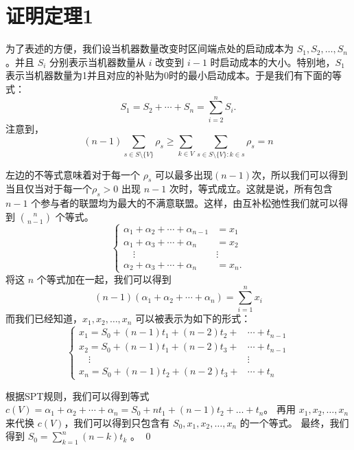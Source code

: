 \documentclass[UTF8]{article}
\begin{document}
\section*{证明定理1}
为了表述的方便，我们设当机器数量改变时区间端点处的启动成本为 $S_{1},S_{2}, \dots ,S_{n}$。并且 $S_{i}$ 分别表示当机器数量从 $i$ 改变到 $i-1$ 时启动成本的大小。特别地，$S_{1}$ 表示当机器数量为1并且对应的补贴为0时的最小启动成本。于是我们有下面的等式：
\begin{displaymath}
  S_{1}=S_{2}+\cdots+S_{n}=\sum_{i=2}^n S_i.
\end{displaymath}
注意到，
\begin{displaymath}
  (n-1) \sum_{s \in S \setminus\{V\} } \rho_s \geq
  \sum_{k\in V}\sum_{s \in S \setminus\{V\}:k \in s} \rho_s = n
\end{displaymath}

左边的不等式意味着对于每一个 $\rho_s$ 可以最多出现$(n-1)$次，所以我们可以得到当且仅当对于每一个$\rho_s > 0$ 出现 $n-1$ 次时，等式成立。这就是说，所有包含 $n-1$ 个参与者的联盟均为最大的不满意联盟。这样，由互补松弛性我们就可以得到 $n \choose n-1$ 个等式。
\[
\begin{cases}
 \alpha_1+\alpha_2+ \cdots+\alpha_{n-1} & = x_1 \\
 \alpha_1+\alpha_3+ \cdots+\alpha_n & = x_2 \\
 \quad   \vdots        &\vdots\\
 \alpha_2+\alpha_3+ \cdots+\alpha_n & = x_n.
\end{cases}
\]
将这 $n$ 个等式加在一起，我们可以得到
\begin{equation*}
  (n-1)(\alpha_1+\alpha_2+ \cdots+\alpha_n)=\sum_{i=1}^{n}x_i
\end{equation*}
而我们已经知道，$x_1,x_2,\dots,x_n$ 可以被表示为如下的形式：
\[
\begin{cases}
x_1 = S_0 + (n-1)t_1 + (n-2)t_2 + &\cdots + t_{n-1} \\
x_2 = S_0 + (n-1)t_1 + (n-2)t_3 + &\cdots + t_{n-1} \\
\quad   \vdots        &\vdots\\
x_n = S_0 + (n-1)t_2 + (n-2)t_3 + &\cdots + t_{n}
\end{cases}
\]

根据SPT规则，我们可以得到等式 $c(V)=\alpha_1+\alpha_2+\cdots+\alpha_n=S_0+nt_1+(n-1)t_2+\dots+t_n$。
再用 $x_1,x_2,\dots,x_n$ 来代换 $c(V)$，我们可以得到只包含有 $S_0,x_1,x_2,\dots,x_n$ 的一个等式。
最终，我们得到 $S_0 = \sum_{k=1}^n (n-k)t_k$ 。
\qed
\end{document}
